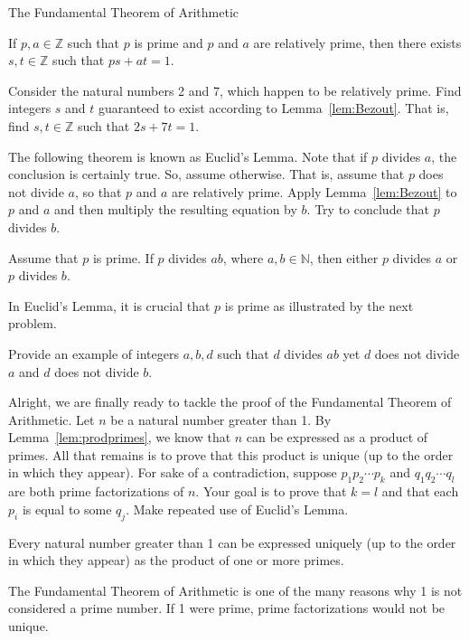 \begin{section}{The Fundamental Theorem of Arithmetic}
\begin{lemma}\label{lem:Bezout}
If $p,a\in\mathbb{Z}$ such that $p$ is prime and $p$ and $a$ are relatively prime, then there exists $s,t\in\mathbb{Z}$ such that $ps+at=1$.
\end{lemma}

\begin{problem}
Consider the natural numbers 2 and 7, which happen to be relatively prime.  Find integers $s$ and $t$ guaranteed to exist according to Lemma~\ref{lem:Bezout}.  That is, find $s,t\in\mathbb{Z}$ such that $2s+7t=1$.
\end{problem}

The following theorem is known as Euclid's Lemma. Note that if $p$ divides $a$, the conclusion is certainly true.  So, assume otherwise.  That is, assume that $p$ does not divide $a$, so that $p$ and $a$ are relatively prime.  Apply Lemma~\ref{lem:Bezout} to $p$ and $a$ and then multiply the resulting equation by $b$. Try to conclude that $p$ divides $b$.

\begin{theorem}\label{thm:Euclid}
Assume that $p$ is prime.  If $p$ divides $ab$, where $a,b\in\mathbb{N}$, then either $p$ divides $a$ or $p$ divides $b$.
\end{theorem}

In Euclid's Lemma, it is crucial that $p$ is prime as illustrated by the next problem.

\begin{problem}
Provide an example of integers $a, b, d$ such that $d$ divides $ab$ yet $d$ does not divide $a$ and $d$ does not divide $b$.
\end{problem}

Alright, we are finally ready to tackle the proof of the Fundamental Theorem of Arithmetic. Let $n$ be a natural number greater than 1. By Lemma~\ref{lem:prodprimes}, we know that $n$ can be expressed as a product of primes.  All that remains is to prove that this product is unique (up to the order in which they appear). For sake of a contradiction, suppose $p_1 p_2 \cdots p_k$ and $q_1 q_2 \cdots q_l$ are both prime factorizations of $n$.  Your goal is to prove that $k=l$ and that each $p_i$ is equal to some $q_j$. Make repeated use of Euclid's Lemma.

\begin{theorem}\label{thm:FTA}
Every natural number greater than 1 can be expressed uniquely (up to the order in which they appear) as the product of one or more primes.
\end{theorem}

The Fundamental Theorem of Arithmetic is one of the many reasons why 1 is not considered a prime number. If 1 were prime, prime factorizations would not be unique.

\end{section}